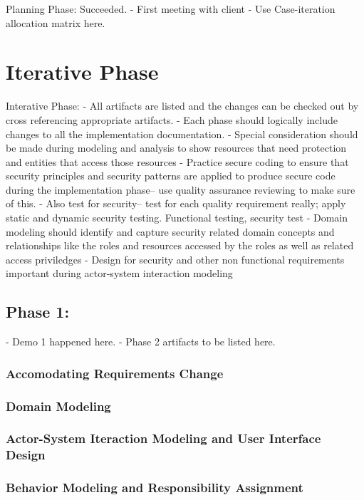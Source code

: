 \documentclass[11pt]{article}
\begin{document}
Planning Phase: Succeeded.
 - First meeting with client
 - Use Case-iteration allocation matrix here.

\section{Iterative Phase}
 Interative Phase:
- All artifacts are listed and the changes can be checked out by cross referencing appropriate artifacts.
- Each phase should logically include changes to all the implementation documentation.
- Special consideration should be made during modeling and analysis to show resources that need protection and entities that access those resources
- Practice secure coding to ensure that security principles and security patterns are applied to produce secure code during the implementation phase-- use quality assurance reviewing to make sure of this.
- Also test for security-- test for each quality requirement really; apply static and dynamic security testing. Functional testing, security test
- Domain modeling should identify and capture security related domain concepts and relationships like the roles and resources accessed by the roles as well as related access priviledges
- Design for security and other non functional requirements important during actor-system interaction modeling

\subsection{Phase 1:}
 - Demo 1 happened here.
 - Phase 2 artifacts to be listed here.

\subsubsection{Accomodating Requirements Change}
 
\subsubsection{Domain Modeling}
 
\subsubsection{Actor-System Iteraction Modeling and User Interface Design}
 
\subsubsection{Behavior Modeling and Responsibility Assignment}
 
\end{document}
